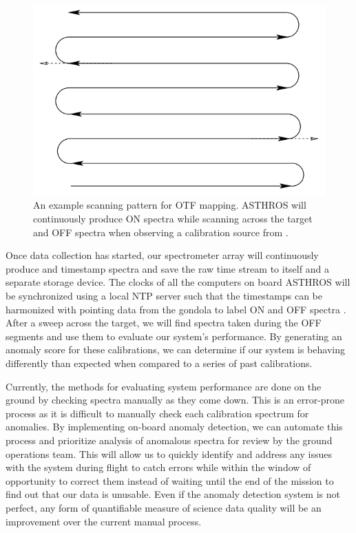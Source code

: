 \begin{figure}
    \centering
    \includegraphics[width=0.5\linewidth]{figs/spectra/scan.png}
    \caption[On-the-Fly Mapping Scanning Pattern Demonstrating On and Off Observations]{An example scanning pattern for OTF mapping. ASTHROS will continuously produce ON spectra while scanning across the target and OFF spectra when observing a calibration source from \parencite{mangum2007fly}.}
    \label{spectra/fig:scan}
\end{figure}

Once data collection has started, our spectrometer array will continuously produce and timestamp spectra and save the raw time stream to itself and a separate storage device. 
The clocks of all the computers on board ASTHROS will be synchronized using a local NTP server such that the timestamps can be harmonized with pointing data from the gondola to label ON and OFF spectra \parencite{mills1991internet}.
After a sweep across the target, we will find spectra taken during the OFF segments and use them to evaluate our system's performance.
By generating an anomaly score for these calibrations, we can determine if our system is behaving differently than expected when compared to a series of past calibrations.

Currently, the methods for evaluating system performance are done on the ground by checking spectra manually as they come down.
This is an error-prone process as it is difficult to manually check each calibration spectrum for anomalies.
By implementing on-board anomaly detection, we can automate this process and prioritize analysis of anomalous spectra for review by the ground operations team.
This will allow us to quickly identify and address any issues with the system during flight to catch errors while within the window of opportunity to correct them instead of waiting until the end of the mission to find out that our data is unusable.
Even if the anomaly detection system is not perfect, any form of quantifiable measure of science data quality will be an improvement over the current manual process.


